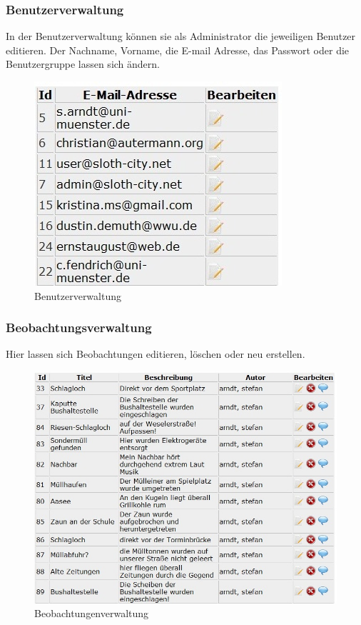 \documentclass[a4paper,11pt]{scrartcl}
\begin{document}
\newpage

\subsubsection{Benutzerverwaltung}
In der Benutzerverwaltung können sie als Administrator die jeweiligen Benutzer editieren. Der Nachname, Vorname, die E-mail Adresse, das Passwort oder die Benutzergruppe lassen sich ändern.
\begin{figure}[h]
\centering
\includegraphics[width = 10 cm]{img/Benutzerverwaltung}
\caption{Benutzerverwaltung}
\label{Benutzerverwaltung}
\end{figure}

\subsubsection{Beobachtungsverwaltung}
Hier lassen sich Beobachtungen editieren, löschen oder neu erstellen.
\begin{figure}[h]
\centering
\includegraphics[width = 10 cm]{img/Beobachtungsverwaltung}
\caption{Beobachtungenverwaltung}
\label{Beobachtungenverwaltung}
\end{figure}
\end{document}
